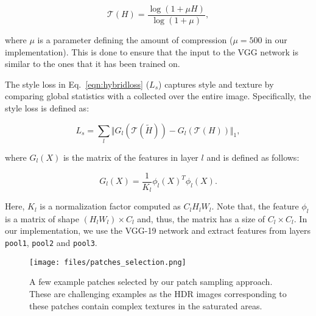\vspace{-5pt}
\begin{equation}
\label{eqn:mulaw}
  \mathcal{T}(H) = \frac{\log(1+ \mu H)}{\log(1+ \mu)},
\end{equation}
\vspace{-5pt}

\noindent where $\mu$ is a parameter defining the amount of compression ($\mu = 500$ in our implementation). This is done to ensure that the input to the VGG network is similar to the ones that it has been trained on. 

The style loss in Eq.~\ref{eqn:hybridloss} (${L}_{s}$) captures style and texture by comparing global statistics with a  collected over the entire image. Specifically, the style loss is defined as:

\vspace{-5pt}
\begin{equation}
    {L}_{s} =  \sum_{l} \Vert G_{l}(\mathcal{T}(\tilde{H})) - G_{l}(\mathcal{T}(H)) \Vert_{1},
\end{equation}
\vspace{-5pt}

\noindent where $G_{l}(X)$ is the  matrix of the features in layer $l$ and is defined as follows:

\vspace{-10pt}
\begin{equation}
    G_{l}(X) = \frac{1}{K_l} \phi_{l}(X)^{T} \phi_{l}(X).
\end{equation}
\vspace{-10pt}

\noindent Here, $K_l$ is a normalization factor computed as ${C_lH_lW_l}$. Note that, the feature $\phi_l$ is a matrix of shape $(H_lW_l) \times C_l$ and, thus, the  matrix has a size of $C_l \times C_l$. In our implementation, we use the VGG-19 \cite{simonyan2014very} network and extract features from layers \texttt{pool1}, \texttt{pool2} and \texttt{pool3}. 



\begin{figure}
  \texttt{[image: files/patches\_selection.png]}
  \vspace{-0.15in}
  \caption{A few example patches selected by our patch sampling approach. These are challenging examples as the HDR images corresponding to these patches contain complex textures in the saturated areas.}
  \label{fig:patches_selection}
  \vspace{-0.20in}
\end{figure}


